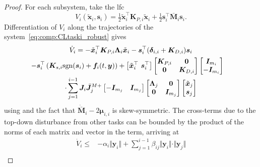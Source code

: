 \documentclass[../main.tex]{subfiles}
\begin{document}
\begin{proof}
For each subsystem, take the \gls{lfc}
\begin{equation}\label{eq:comp:Vi}
    V_i(\tilde{\bm{x}}_i,\bm{s}_i) = \tfrac{1}{2} \tilde{\bm{x}}_i^\top \bm{K}_{P,i} \tilde{\bm{x}}_i + \tfrac{1}{2} \bm{s}_i^\top\bar{\bm{M}}_i \bm{s}_i .
\end{equation}
Differentiation of $V_i$ along the trajectories of the system~\eqref{eq:comp:CLtaski_robust} gives
    \begin{multline} \label{eq:comp:Vidot_robust}
        \dot{V}_i = - \tilde{\bm{x}}_i^\top  \bm{K}_{P,i} \bm{\Lambda}_i \tilde{\bm{x}}_i - \bm{s}_i^\top( \bm{\delta}_{i,i} + \bm{K}_{D,i}) \bm{s}_i \\
         \hspace{-1em} - \bm{s}_i^\top \left( \bm{K}_{s,i} \textrm{sgn} (\bm{s}_i) + \bm{f}_i(t,\bm{y}) \right) + \left[ \tilde{\bm{x}}_i^\top \ \bm{s}_i^\top \right]
        \begin{bmatrix}
            \bm{K}_{P,i} & \bm{0} \\ \bm{0} & \bm{K}_{D,i}
        \end{bmatrix}
        \begin{bmatrix}
            \bm{I}_{m_i} \\ -\bm{I}_{m_i}
        \end{bmatrix} \\
        \cdot
        \sum_{j=1}^{i-1}
            \bm{J}_i \bar{\bm{J}}_j^{M+}
        \begin{bmatrix}
            -\bm{I}_{m_j} & \bm{I}_{m_j}
        \end{bmatrix}
        \begin{bmatrix}
            \bm{\Lambda}_j & \bm{0} \\ \bm{0} & \bm{I}_{m_j}
        \end{bmatrix}
        \begin{bmatrix}
            \tilde{\bm{x}}_j \\ \bm{s}_j
        \end{bmatrix}
    \end{multline}
using  and the fact that $\dot{\bar{\bm{M}}}_i-2\bm{\mu}_{i,i}$ is skew-symmetric. The cross-terms due to the top-down disturbance from other tasks can be bounded by the product of the norms of each matrix and vector in the term, arriving at
\begin{equation}\label{eq:Vi_dot_bound}
    \begin{split}
    \dot{V}_i \leq{}& -\alpha_i \Vert \bm{y}_i \Vert + \sum_{j=1}^{i-1} \beta_{ij} \Vert \bm{y}_i \Vert \cdot \Vert \bm{y}_j \Vert \\

\end{split}
\end{equation}
\end{proof}
\end{document}
